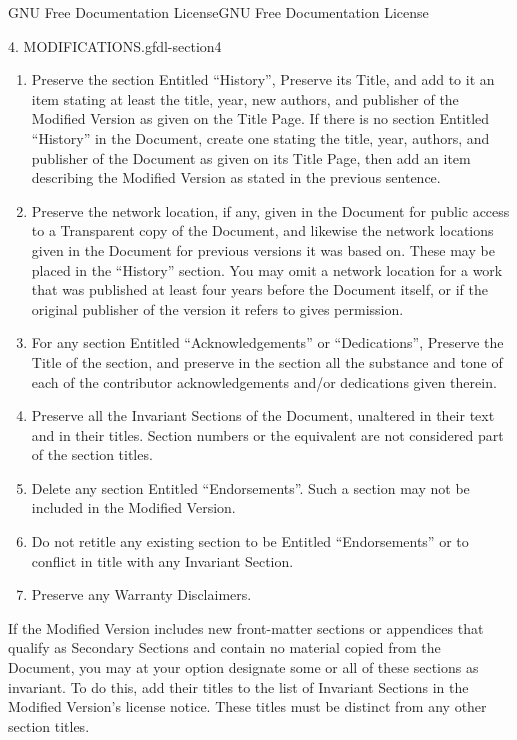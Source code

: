 \documentclass[10pt,]{book}
\numberwithin{equation}{section}
\begin{document}
\begin{appendixptx}{GNU Free Documentation License}{}{GNU Free Documentation License}{}{}
\begin{paragraphs}{4. MODIFICATIONS.}{gfdl-section4}
\begin{enumerate}[label=\Alph*.]
\item\hypertarget{li-113}{}\hypertarget{p-1338}{}%
Preserve the section Entitled ``History'', Preserve its Title, and add to it an item stating at least the title, year, new authors, and publisher of the Modified Version as given on the Title Page. If there is no section Entitled ``History'' in the Document, create one stating the title, year, authors, and publisher of the Document as given on its Title Page, then add an item describing the Modified Version as stated in the previous sentence.%
\item\hypertarget{li-114}{}\hypertarget{p-1339}{}%
Preserve the network location, if any, given in the Document for public access to a Transparent copy of the Document, and likewise the network locations given in the Document for previous versions it was based on.  These may be placed in the ``History'' section. You may omit a network location for a work that was published at least four years before the Document itself, or if the original publisher of the version it refers to gives permission.%
\item\hypertarget{li-115}{}\hypertarget{p-1340}{}%
For any section Entitled ``Acknowledgements'' or ``Dedications'', Preserve the Title of the section, and preserve in the section all the substance and tone of each of the contributor acknowledgements and/or dedications given therein.%
\item\hypertarget{li-116}{}\hypertarget{p-1341}{}%
Preserve all the Invariant Sections of the Document, unaltered in their text and in their titles. Section numbers or the equivalent are not considered part of the section titles.%
\item\hypertarget{li-117}{}\hypertarget{p-1342}{}%
Delete any section Entitled ``Endorsements''. Such a section may not be included in the Modified Version.%
\item\hypertarget{li-118}{}\hypertarget{p-1343}{}%
Do not retitle any existing section to be Entitled ``Endorsements'' or to conflict in title with any Invariant Section.%
\item\hypertarget{li-119}{}\hypertarget{p-1344}{}%
Preserve any Warranty Disclaimers.%
\end{enumerate}
\hypertarget{p-1345}{}%
If the Modified Version includes new front-matter sections or appendices that qualify as Secondary Sections and contain no material copied from the Document, you may at your option designate some or all of these sections as invariant. To do this, add their titles to the list of Invariant Sections in the Modified Version's license notice. These titles must be distinct from any other section titles.%

\end{paragraphs}
\end{appendixptx}
\end{document}
